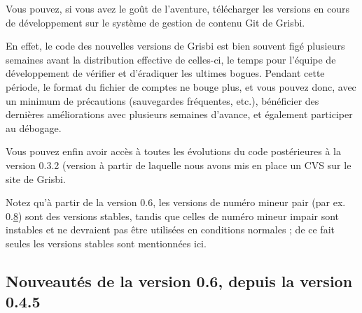 Vous pouvez, si vous avez le goût de l'aventure, télécharger les versions en 
cours de développement sur le système de gestion de contenu \gls{Git} de Grisbi.

En effet, le code des nouvelles versions de Grisbi est bien souvent figé
plusieurs semaines avant la distribution effective de celles-ci, le temps pour 
l'équipe de développement de vérifier et d'éradiquer les ultimes bogues. Pendant cette période, le format du fichier de comptes ne bouge plus, et vous pouvez donc, avec un minimum de précautions (sauvegardes fréquentes, etc.), bénéficier des dernières améliorations avec plusieurs semaines d'avance, et également participer au débogage.

Vous pouvez enfin avoir accès à toutes les évolutions du code postérieures à
la version 0.3.2 (version à partir de laquelle nous avons mis en place un \gls{CVS} sur le 
site de Grisbi.

Notez qu'à partir de la version 0.6, les versions de numéro mineur pair (par ex. 0.\underline8) sont des versions stables, tandis que celles de numéro mineur impair sont instables et ne devraient pas être utilisées en conditions normales ; de ce fait seules les versions stables sont mentionnées ici.

\newpage


\subsection{Nouveautés de la version 0.6, depuis la version 0.4.5}

